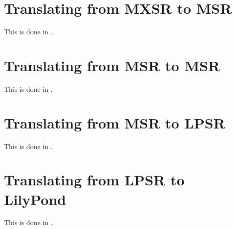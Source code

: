 \section{Translating from MXSR to MSR}

This is done in \mxsrToMsr{}.


\section{Translating from MSR to MSR}

This is done in \msrToMsr{}.


\section{Translating from MSR to LPSR}

This is done in \msrToLpsr{}.


\section{Translating from LPSR to LilyPond}

This is done in \lpsrToLilypond{}.


